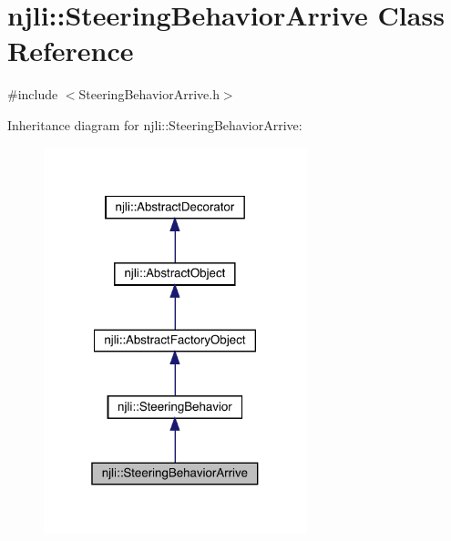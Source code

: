 \hypertarget{classnjli_1_1_steering_behavior_arrive}{}\section{njli\+:\+:Steering\+Behavior\+Arrive Class Reference}
\label{classnjli_1_1_steering_behavior_arrive}


{\ttfamily \#include $<$Steering\+Behavior\+Arrive.\+h$>$}



Inheritance diagram for njli\+:\+:Steering\+Behavior\+Arrive\+:\nopagebreak
\begin{figure}[H]
\begin{center}
\leavevmode
\includegraphics[width=217pt]{classnjli_1_1_steering_behavior_arrive__inherit__graph}
\end{center}
\end{figure}



